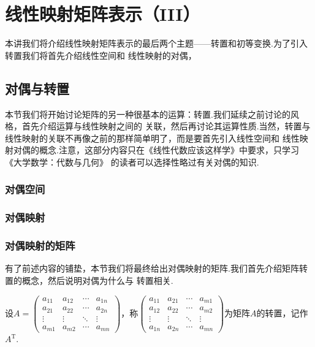 \chapter{线性映射矩阵表示（III）}

本讲我们将介绍线性映射矩阵表示的最后两个主题——转置和初等变换.为了引入转置我们将首先介绍线性空间和
线性映射的对偶，

\section{对偶与转置}
本节我们将开始讨论矩阵的另一种很基本的运算：转置.我们延续之前讨论的风格，首先介绍运算与线性映射之间的
关联，然后再讨论其运算性质.当然，转置与线性映射的关联不再像之前的那样简单明了，而是要首先引入线性空间和
线性映射对偶的概念.注意，这部分内容只在《线性代数应该这样学》中要求，只学习《大学数学：代数与几何》
的读者可以选择性略过有关对偶的知识.

\subsection{对偶空间}


\subsection{对偶映射}


\subsection{对偶映射的矩阵}
有了前述内容的铺垫，本节我们将最终给出对偶映射的矩阵.我们首先介绍矩阵转置的概念，然后说明对偶为什么与
转置相关.
\begin{definition}
    设$A=\begin{pmatrix}
        a_{11} & a_{12} & \cdots & a_{1n} \\
        a_{21} & a_{22} & \cdots & a_{2n} \\
        \vdots & \vdots & \ddots & \vdots \\
        a_{m1} & a_{m2} & \cdots & a_{mn}
    \end{pmatrix}$，称$\begin{pmatrix}
        a_{11} & a_{21} & \cdots & a_{m1} \\
        a_{12} & a_{22} & \cdots & a_{m2} \\
        \vdots & \vdots & \ddots & \vdots \\
        a_{1n} & a_{2n} & \cdots & a_{mn}
    \end{pmatrix}$为矩阵$A$的转置，记作$A^\mathrm{T}$.
\end{definition}

